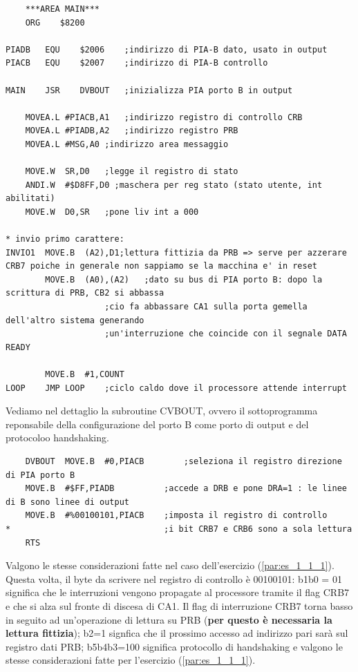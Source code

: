 \begin{lstlisting}
    ***AREA MAIN***
	ORG    $8200

PIADB	EQU    $2006	;indirizzo di PIA-B dato, usato in output 
PIACB	EQU    $2007	;indirizzo di PIA-B controllo

MAIN	JSR    DVBOUT	;inizializza PIA porto B in output

	MOVEA.L	#PIACB,A1	;indirizzo registro di controllo CRB
	MOVEA.L	#PIADB,A2	;indirizzo registro PRB
	MOVEA.L	#MSG,A0	;indirizzo area messaggio

	MOVE.W	SR,D0	;legge il registro di stato
	ANDI.W	#$D8FF,D0 ;maschera per reg stato (stato utente, int abilitati)
	MOVE.W	D0,SR	;pone liv int a 000

* invio primo carattere:	
INVIO1	MOVE.B	(A2),D1;lettura fittizia da PRB => serve per azzerare CRB7 poiche in generale non sappiamo se la macchina e' in reset
	    MOVE.B	(A0),(A2)	;dato su bus di PIA porto B: dopo la scrittura di PRB, CB2 si abbassa
					;cio fa abbassare CA1 sulla porta gemella dell'altro sistema generando 
					;un'interruzione che coincide con il segnale DATA READY

	    MOVE.B	#1,COUNT
LOOP  	JMP LOOP	;ciclo caldo dove il processore attende interrupt		
\end{lstlisting}

Vediamo nel dettaglio la subroutine CVBOUT, ovvero il sottoprogramma reponsabile della configurazione del porto B come porto di output e del protocoloo handshaking.

\begin{lstlisting}
    DVBOUT	MOVE.B	#0,PIACB		;seleziona il registro direzione di PIA porto B 
	MOVE.B	#$FF,PIADB	  		;accede a DRB e pone DRA=1 : le linee di B sono linee di output	
	MOVE.B	#%00100101,PIACB   	;imposta il registro di controllo 
*								;i bit CRB7 e CRB6 sono a sola lettura	
	RTS
\end{lstlisting}

Valgono le stesse considerazioni fatte nel caso dell'esercizio (\ref{par:es_1_1_1}). Questa volta, il byte da scrivere nel registro di controllo è 00100101: b1b0 = 01 significa che le interruzioni vengono propagate al processore tramite il flag CRB7 e che si alza sul fronte di discesa di CA1. Il flag di interruzione CRB7 torna basso in seguito ad un'operazione di lettura su PRB (\textbf{per questo è necessaria la lettura fittizia}); b2=1 signfica che il prossimo accesso ad indirizzo pari sarà sul registro dati PRB; b5b4b3=100 significa protocollo di handshaking e valgono le stesse considerazioni fatte per l'esercizio (\ref{par:es_1_1_1}). 

